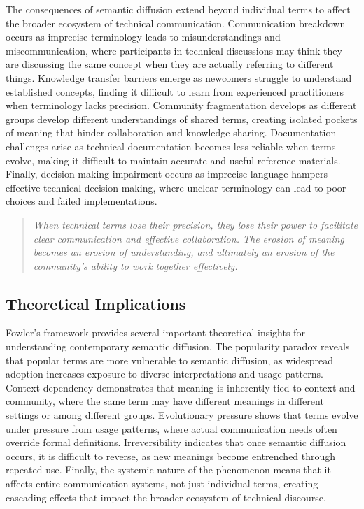 \documentclass[11pt]{article}
\begin{document}
The consequences of semantic diffusion extend beyond individual terms to affect the broader ecosystem of technical communication. Communication breakdown occurs as imprecise terminology leads to misunderstandings and miscommunication, where participants in technical discussions may think they are discussing the same concept when they are actually referring to different things. Knowledge transfer barriers emerge as newcomers struggle to understand established concepts, finding it difficult to learn from experienced practitioners when terminology lacks precision. Community fragmentation develops as different groups develop different understandings of shared terms, creating isolated pockets of meaning that hinder collaboration and knowledge sharing. Documentation challenges arise as technical documentation becomes less reliable when terms evolve, making it difficult to maintain accurate and useful reference materials. Finally, decision making impairment occurs as imprecise language hampers effective technical decision making, where unclear terminology can lead to poor choices and failed implementations.

\begin{quote}
\emph{When technical terms lose their precision, they lose their power to facilitate clear communication and effective collaboration. The erosion of meaning becomes an erosion of understanding, and ultimately an erosion of the community's ability to work together effectively.}
\end{quote}

\subsection{Theoretical Implications}

Fowler's framework provides several important theoretical insights for understanding contemporary semantic diffusion. The popularity paradox reveals that popular terms are more vulnerable to semantic diffusion, as widespread adoption increases exposure to diverse interpretations and usage patterns. Context dependency demonstrates that meaning is inherently tied to context and community, where the same term may have different meanings in different settings or among different groups. Evolutionary pressure shows that terms evolve under pressure from usage patterns, where actual communication needs often override formal definitions. Irreversibility indicates that once semantic diffusion occurs, it is difficult to reverse, as new meanings become entrenched through repeated use. Finally, the systemic nature of the phenomenon means that it affects entire communication systems, not just individual terms, creating cascading effects that impact the broader ecosystem of technical discourse.
\end{document}

